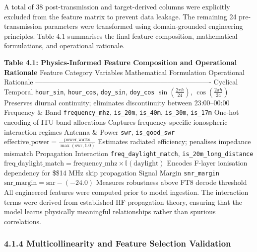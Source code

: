 A total of 38 post-transmission and target-derived columns were
explicitly excluded from the feature matrix to prevent data leakage. The
remaining 24 pre-transmission parameters were transformed using
domain-grounded engineering principles. Table 4.1 summarises the final
feature composition, mathematical formulations, and operational
rationale.

\textbf{Table 4.1: Physics-Informed Feature Composition and Operational
Rationale} \textbar{} Feature Category \textbar{} Variables \textbar{}
Mathematical Formulation \textbar{} Operational Rationale \textbar{}
\textbar------------------\textbar-----------\textbar--------------------------\textbar----------------------\textbar{}
\textbar{} Cyclical Temporal \textbar{} \texttt{hour\_sin},
\texttt{hour\_cos}, \texttt{doy\_sin}, \texttt{doy\_cos} \textbar{}
\(\sin\left(\frac{2\pi h}{24}\right)\),
\(\cos\left(\frac{2\pi h}{24}\right)\) \textbar{} Preserves diurnal
continuity; eliminates discontinuity between 23:00--00:00 \textbar{}
\textbar{} Frequency \& Band \textbar{} \texttt{frequency\_mhz},
\texttt{is\_20m}, \texttt{is\_40m}, \texttt{is\_30m}, \texttt{is\_17m}
\textbar{} One-hot encoding of ITU band allocations \textbar{} Captures
frequency-specific ionospheric interaction regimes \textbar{} \textbar{}
Antenna \& Power \textbar{} \texttt{swr}, \texttt{is\_good\_swr}
\textbar{}
\(\text{effective\_power} = \frac{\text{power\_watts}}{\max(\text{swr}, 1.0)}\)
\textbar{} Estimates radiated efficiency; penalises impedance mismatch
\textbar{} \textbar{} Propagation Interaction \textbar{}
\texttt{freq\_daylight\_match}, \texttt{is\_20m\_long\_distance}
\textbar{}
\(\text{freq\_daylight\_match} = \text{frequency\_mhz} \times \mathbb{I}(\text{daylight})\)
\textbar{} Encodes F-layer ionisation dependency for \$\geq\$14 MHz skip
propagation \textbar{} \textbar{} Signal Margin \textbar{}
\texttt{snr\_margin} \textbar{}
\(\text{snr\_margin} = \text{snr} - (-24.0)\) \textbar{} Measures
robustness above FT8 decode threshold \textbar{} All engineered features
were computed prior to model ingestion. The interaction terms were
derived from established HF propagation theory, ensuring that the model
learns physically meaningful relationships rather than spurious
correlations.

\subsubsection{4.1.4 Multicollinearity and Feature Selection
Validation}\label{multicollinearity-and-feature-selection-validation}

